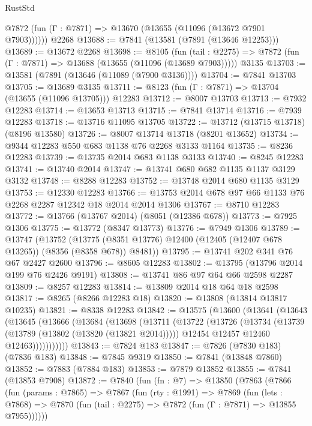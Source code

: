 \begin{lexlean}{RustStd}
\begin{coremodule}
{\begin{coremodule}
{{{{{{{{{{{{{{{{{{{{{{{{{{{{{{{{{{{{{{{{{{{{{{{{{{{{{{      @7872 (fun (Γ : @7871) => @13670 (@13655 (@11096 (@13672 @7901 @7903))))))
    @2268
@13688 := @7841 (@13581 (@7891 (@13646 @12253)))
@13689 := @13672 @2268
@13698 := @8105
    (fun (tail : @2275) => @7872 (fun (Γ : @7871) => @13688 (@13655 (@11096 (@13689 @7903)))))
    @3135
@13703 := @13581 (@7891 (@13646 (@11089 (@7900 @3136))))
@13704 := @7841 @13703
@13705 := @13689 @3135
@13711 := @8123 (fun (Γ : @7871) => @13704 (@13655 (@11096 @13705))) @12283
@13712 := @8007 @13703
@13713 := @7932 @12283
@13714 := @13653 @13713
@13715 := @7841 @13714
@13716 := @7939 @12283
@13718 := @13716 @11095 @13705
@13722 := @13712 (@13715 @13718) (@8196 @13580)
@13726 := @8007 @13714 @13718 (@8201 @13652)
@13734 := @9344 @12283 @550 @683 @1138 @76 @2268 @3133 @1164
@13735 := @8236 @12283
@13739 := @13735 @2014 @683 @1138 @3133
@13740 := @8245 @12283
@13741 := @13740 @2014
@13747 := @13741 @680 @682 @1135 @1137 @3129 @3132
@13748 := @8288 @12283
@13752 := @13748 @2014 @680 @1135 @3129
@13753 := @12330 @12283
@13766 := @13753 @2014 @678 @97 @66 @1133 @76 @2268 @2287 @12342 @18 @2014 @2014 @1306
@13767 := @8710 @12283
@13772 := @13766 (@13767 @2014) (@8051 (@12386 @678))
@13773 := @7925 @1306
@13775 := @13772 (@8347 @13773)
@13776 := @7949 @1306
@13789 := @13747
    (@13752 (@13775 (@8351 @13776) @12400 (@12405 (@12407 @678 @13265)) (@8356 (@8358 @678)) @8481))
@13795 := @13741 @202 @341 @76 @67 @2427 @2600
@13796 := @8605 @12283
@13802 := @13795 (@13796 @2014 @199 @76 @2426 @9191)
@13808 := @13741 @86 @97 @64 @66 @2598 @2287
@13809 := @8257 @12283
@13814 := @13809 @2014 @18 @64 @18 @2598
@13817 := @8265 (@8266 @12283 @18)
@13820 := @13808 (@13814 @13817 @10235)
@13821 := @8338 @12283
@13842 := @13575
    (@13600
      (@13641
        (@13643
          (@13645
            (@13666
              (@13684
                (@13698
                  (@13711
                    (@13722
                      (@13726
                        (@13734
                          (@13739 (@13789 (@13802 (@13820 (@13821 @2014)))))
                          @12454
                          @12457
                          @12460
                          @12463)))))))))))
@13843 := @7824 @183
@13847 := @7826 (@7830 @183) (@7836 @183)
@13848 := @7845 @9319
@13850 := @7841 (@13848 @7860)
@13852 := @7883 (@7884 @183)
@13853 := @7879 @13852
@13855 := @7841 (@13853 @7908)
@13872 := @7840
    (fun (fn : @7) =>
    @13850
      (@7863
        (@7866
          (fun (params : @7865) =>
          @7867
            (fun (rty : @1991) =>
            @7869
              (fun (lets : @7868) =>
              @7870 (fun (tail : @2275) => @7872 (fun (Γ : @7871) => @13855 @7955))))))
}}}}}}}}}}}}}}}}}}}}}}}}}}}}}}}}}}}}}}}}}}}}}}}}}}}}}}
\end{coremodule}}
\end{coremodule}
\end{lexlean}
